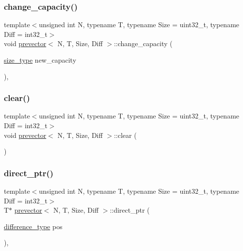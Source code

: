 \mbox{\label{classprevector_a0e673654d3b7d8d6f79534e17f68741a}} 
\subsubsection{\texorpdfstring{change\+\_\+capacity()}{change\_capacity()}}
{\footnotesize\ttfamily template$<$unsigned int N, typename T, typename Size = uint32\+\_\+t, typename Diff = int32\+\_\+t$>$ \\
void \mbox{\hyperlink{classprevector}{prevector}}$<$ N, T, Size, Diff $>$\+::change\+\_\+capacity (\begin{DoxyParamCaption}\item[{\mbox{\hyperlink{classprevector_a7e0da95e6d1c878f6eeb572f4fc12524}{size\+\_\+type}}}]{new\+\_\+capacity }\end{DoxyParamCaption})\hspace{0.3cm}{\ttfamily [inline]}, {\ttfamily [private]}}

\mbox{\label{classprevector_a412f07b8bf5485dabe2fe9d6d5dfe763}} 
\subsubsection{\texorpdfstring{clear()}{clear()}}
{\footnotesize\ttfamily template$<$unsigned int N, typename T, typename Size = uint32\+\_\+t, typename Diff = int32\+\_\+t$>$ \\
void \mbox{\hyperlink{classprevector}{prevector}}$<$ N, T, Size, Diff $>$\+::clear (\begin{DoxyParamCaption}{ }\end{DoxyParamCaption})\hspace{0.3cm}{\ttfamily [inline]}}

\mbox{\label{classprevector_a20150a43dd87c33f0e855a55bd3418e8}} 
\subsubsection{\texorpdfstring{direct\+\_\+ptr()}{direct\_ptr()}\hspace{0.1cm}{\footnotesize\ttfamily [1/2]}}
{\footnotesize\ttfamily template$<$unsigned int N, typename T, typename Size = uint32\+\_\+t, typename Diff = int32\+\_\+t$>$ \\
T$\ast$ \mbox{\hyperlink{classprevector}{prevector}}$<$ N, T, Size, Diff $>$\+::direct\+\_\+ptr (\begin{DoxyParamCaption}\item[{\mbox{\hyperlink{classprevector_a34ad7f610eefb33a8db9161cadf15dbe}{difference\+\_\+type}}}]{pos }\end{DoxyParamCaption})\hspace{0.3cm}{\ttfamily [inline]}, {\ttfamily [private]}}

